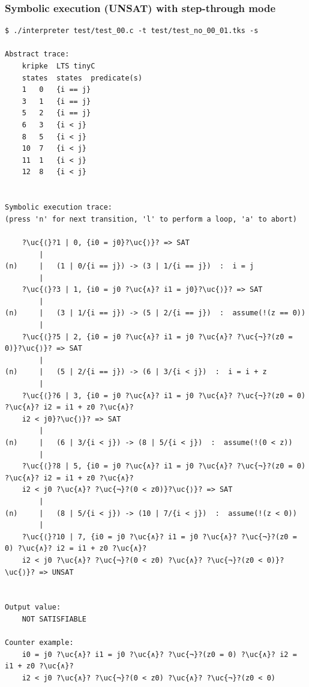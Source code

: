 \documentclass[english,a4paper,oneside]{article}%
\newcommand{\uc}[1]{ \scriptsize{\texttt{#1}} }
\begin{document}
\subsubsection{Symbolic execution (UNSAT) with step-through mode}
\begin{scriptsize}
\begin{lstlisting}
$ ./interpreter test/test_00.c -t test/test_no_00_01.tks -s

Abstract trace:
	kripke	LTS	tinyC
	states	states	predicate(s)
	1	0	{i == j}
	3	1	{i == j}
	5	2	{i == j}
	6	3	{i < j}
	8	5	{i < j}
	10	7	{i < j}
	11	1	{i < j}
	12	8	{i < j}
								

Symbolic execution trace:
(press 'n' for next transition, 'l' to perform a loop, 'a' to abort)

	?\uc{⟨}?1 | 0, {i0 = j0}?\uc{⟩}? => SAT
		|
(n)		|	(1 | 0/{i == j}) -> (3 | 1/{i == j})  :  i = j
		|
	?\uc{⟨}?3 | 1, {i0 = j0 ?\uc{∧}? i1 = j0}?\uc{⟩}? => SAT
		|
(n)		|	(3 | 1/{i == j}) -> (5 | 2/{i == j})  :  assume(!(z == 0))
		|
	?\uc{⟨}?5 | 2, {i0 = j0 ?\uc{∧}? i1 = j0 ?\uc{∧}? ?\uc{¬}?(z0 = 0)}?\uc{⟩}? => SAT
		|
(n)		|	(5 | 2/{i == j}) -> (6 | 3/{i < j})  :  i = i + z
		|
	?\uc{⟨}?6 | 3, {i0 = j0 ?\uc{∧}? i1 = j0 ?\uc{∧}? ?\uc{¬}?(z0 = 0) ?\uc{∧}? i2 = i1 + z0 ?\uc{∧}? 
	i2 < j0}?\uc{⟩}? => SAT
		|
(n)		|	(6 | 3/{i < j}) -> (8 | 5/{i < j})  :  assume(!(0 < z))
		|
	?\uc{⟨}?8 | 5, {i0 = j0 ?\uc{∧}? i1 = j0 ?\uc{∧}? ?\uc{¬}?(z0 = 0) ?\uc{∧}? i2 = i1 + z0 ?\uc{∧}? 
	i2 < j0 ?\uc{∧}? ?\uc{¬}?(0 < z0)}?\uc{⟩}? => SAT
		|
(n)		|	(8 | 5/{i < j}) -> (10 | 7/{i < j})  :  assume(!(z < 0))
		|
	?\uc{⟨}?10 | 7, {i0 = j0 ?\uc{∧}? i1 = j0 ?\uc{∧}? ?\uc{¬}?(z0 = 0) ?\uc{∧}? i2 = i1 + z0 ?\uc{∧}? 
	i2 < j0 ?\uc{∧}? ?\uc{¬}?(0 < z0) ?\uc{∧}? ?\uc{¬}?(z0 < 0)}?\uc{⟩}? => UNSAT


Output value:
	NOT SATISFIABLE

Counter example:
	i0 = j0 ?\uc{∧}? i1 = j0 ?\uc{∧}? ?\uc{¬}?(z0 = 0) ?\uc{∧}? i2 = i1 + z0 ?\uc{∧}? 
	i2 < j0 ?\uc{∧}? ?\uc{¬}?(0 < z0) ?\uc{∧}? ?\uc{¬}?(z0 < 0)

\end{lstlisting}
\end{scriptsize}
\end{document}
